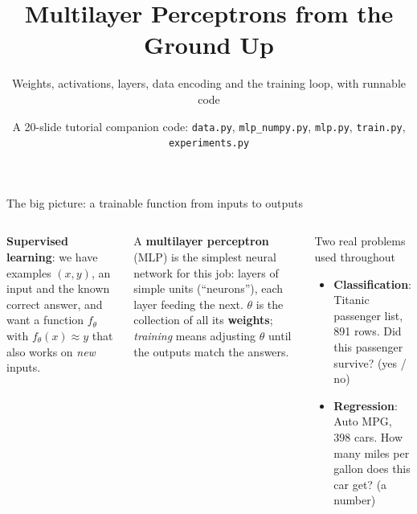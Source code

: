 \documentclass[aspectratio=169,10pt]{beamer}
\title{Multilayer Perceptrons from the Ground Up}
\subtitle{Weights, activations, layers, data encoding and the training loop, with runnable code}
\date{A 20-slide tutorial \textbullet{} companion code: \texttt{data.py}, \texttt{mlp\_numpy.py},
      \texttt{mlp.py}, \texttt{train.py}, \texttt{experiments.py}}
\newcommand{\key}[1]{\textbf{\color{cAtt}#1}}
\begin{document}
\maketitle
\addtocounter{framenumber}{1}

\begin{frame}{The big picture: a trainable function from inputs to outputs}
\begin{columns}[T,onlytextwidth]
\small
\textbf{Supervised learning}: we have examples $(x, y)$, an input and the known correct answer,
and want a function $f_\theta$ with $f_\theta(x)\approx y$ that also works on \emph{new} inputs.

\vspace{1mm}
A \key{multilayer perceptron} (MLP) is the simplest neural network for this job:
layers of simple units (``neurons''), each layer feeding the next.
$\theta$ is the collection of all its \textbf{weights}; \emph{training} means adjusting
$\theta$ until the outputs match the answers.
\begin{block}{Two real problems used throughout}
\footnotesize
\begin{itemize}
  \item \textbf{Classification}: Titanic passenger list, 891 rows. Did this passenger survive?
        (yes / no)
  \item \textbf{Regression}: Auto MPG, 398 cars. How many miles per gallon does this car get?
        (a number)
\end{itemize}
\end{block}
\end{columns}
\vspace{2mm}
\centering
{}
\end{frame}
\end{document}
